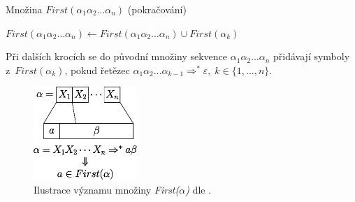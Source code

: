 \begin{algorithm}[h]
    \caption{Množina $First(\alpha_1\alpha_2\ldots\alpha_n)$ (pokračování)}
    \begin{algorithmic}[1]
                \State $First(\alpha_1\alpha_2\ldots\alpha_n) \gets First(\alpha_1\alpha_2\ldots\alpha_n) \cup First(\alpha_k)$
            \EndIf
        \EndWhile
    \end{algorithmic}
\end{algorithm}
Při dalších krocích se do původní množiny sekvence $\alpha_1\alpha_2\ldots\alpha_n$ přidávají symboly z~$First(\alpha_k)$, pokud řetězec $\alpha_1\alpha_2\ldots\alpha_{k-1} \Rightarrow^* \varepsilon,\; k \in \{1,\ldots,n\}$.

\begin{figure}[ht]
    \centering
    \includegraphics[width=0.35\textwidth]{obrazky-figures/first.eps}
    \caption{Ilustrace významu množiny \emph{First($\alpha$)} dle \cite{meduna2017sa-shora-dolu}.}
    \label{fig_mnozina_first}
\end{figure}

